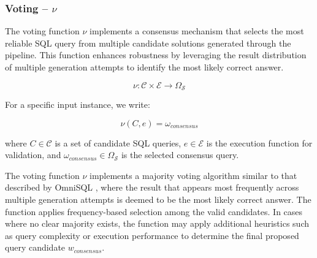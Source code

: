 \subsubsection{Voting – $\nu$}\label{design:voting-function}

The voting function $\nu$ implements a consensus mechanism that selects the most
reliable SQL query from multiple candidate solutions generated through the pipeline.
This function enhances robustness by leveraging the result distribution of multiple
generation attempts to identify the most likely correct answer.

$$
\nu: \mathcal{C} \times \mathcal{E} \rightarrow \Omega_{\mathcal{S}}
$$

\vspace{0.5em}

For a specific input instance, we write:

$$
\nu(C, e) = \omega_{consensus}
$$

where $C \in \mathcal{C}$ is a set of candidate SQL queries, $e \in \mathcal{E}$ is
the execution function for validation, and $\omega_{consensus} \in \Omega_{\mathcal{S}}$
is the selected consensus query.

\vspace{0.5em}

The voting function $\nu$ implements a majority voting algorithm similar to that
described by OmniSQL \citep{OmniSQL}, where the result that appears most frequently
across multiple generation attempts is deemed to be the most likely correct answer.
The function applies frequency-based selection among the valid candidates. In cases where
no clear majority exists, the function may apply additional heuristics such as query
complexity or execution performance to determine the final proposed query candidate $w_{consensus}$.

